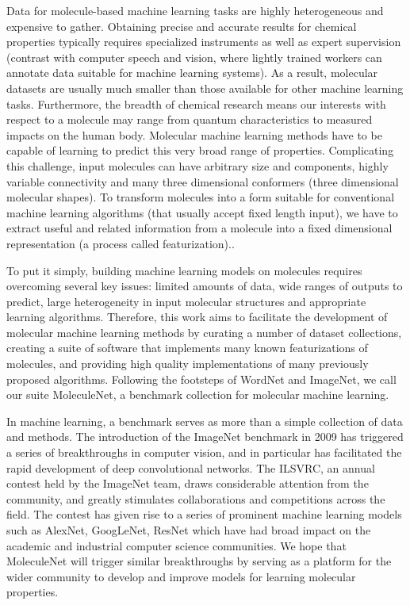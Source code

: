 Data for molecule-based machine learning tasks are highly heterogeneous and expensive to gather. Obtaining precise and accurate results for chemical properties typically requires specialized instruments as well as expert supervision (contrast with computer speech and vision, where lightly trained workers can annotate data suitable for machine learning systems). As a result, molecular datasets are usually much smaller than those available for other machine learning tasks. Furthermore, the breadth of chemical research means our interests with respect to a molecule may range from quantum characteristics to measured impacts on the human body. Molecular machine learning methods have to be capable of learning to predict this very broad range of properties. Complicating this challenge, input molecules can have arbitrary size and components, highly variable connectivity and many three dimensional conformers (three dimensional molecular shapes). To transform molecules into a form suitable for conventional machine learning algorithms (that usually accept fixed length input), we have to extract useful and related information from a molecule into a fixed dimensional representation (a process called featurization).\cite{ECFP, graphconv_feat, kearnes2016graphconv}.  

To put it simply, building machine learning models on molecules requires overcoming several key issues: limited amounts of data, wide ranges of outputs to predict, large heterogeneity in input molecular structures and appropriate learning algorithms. Therefore, this work aims to facilitate the development of molecular machine learning methods by curating a number of dataset collections, creating a suite of software that implements many known featurizations of molecules, and providing high quality implementations of many previously proposed algorithms. Following the footsteps of WordNet\cite{wordnet} and ImageNet\cite{imagenet_cvpr09}, we call our suite MoleculeNet, a benchmark collection for molecular machine learning.

In machine learning, a benchmark serves as more than a simple collection of data and methods. The introduction of the ImageNet benchmark in 2009 has triggered a series of breakthroughs in computer vision, and in particular has facilitated the rapid development of deep convolutional networks. The ILSVRC, an annual contest held by the ImageNet team\cite{ILSVRC15}, draws considerable attention from the community, and greatly stimulates collaborations and competitions across the field. The contest has given rise to a series of prominent machine learning models such as AlexNet\cite{alexnet}, GoogLeNet\cite{googlenet}, ResNet\cite{resnet} which have had broad impact on the academic and industrial computer science communities. We hope that MoleculeNet will trigger similar breakthroughs by serving as a platform for the wider community to develop and improve models for learning molecular properties.

